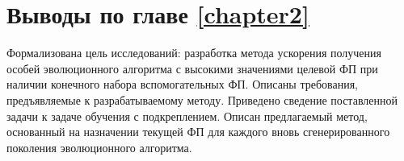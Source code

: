 \section{Выводы по главе \protect\ref{chapter2}}
 Формализована цель исследований: разработка метода ускорения получения особей эволюционного алгоритма с высокими значениями целевой ФП при наличии конечного набора вспомогательных ФП. Описаны требования, предъявляемые к разрабатываемому методу. 
 Приведено сведение поставленной задачи к задаче обучения с подкреплением. Описан предлагаемый метод, основанный на назначении текущей ФП для каждого вновь сгенерированного поколения эволюционного алгоритма.
